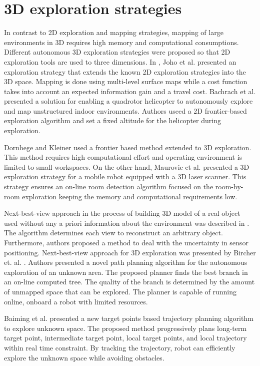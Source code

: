\section{3D exploration strategies}

In contrast to 2D exploration and mapping strategies, mapping of large environments in 3D requires high memory and
computational consumptions. 
Different autonomous 3D exploration strategies were proposed so that 2D
exploration tools are used to three dimensions. In \cite{Joho2007}, Joho et al. presented an exploration strategy that extends the known 2D exploration strategies into the 3D space. Mapping is done using multi-level surface maps while a cost function takes
into account an expected information gain and a travel cost. 
Bachrach et
al. \cite{Bachrach2009} presented a solution for enabling a quadrotor helicopter to
autonomously explore and map unstructured indoor environments. Authors useed a 2D frontier-based exploration algorithm and set a fixed altitude for the helicopter
during exploration.  

Dornhege and Kleiner \cite{Dornhege2013} used a frontier based method extended to 3D exploration. This method requires high computational effort and operating environment is limited to small workspaces. On the other hand, Maurovic et al. \cite{Maurovic2014} presented a 3D exploration strategy for a mobile
robot equipped with a 3D laser scanner. This strategy ensures an on-line room detection algorithm focused on the room-by-room exploration keeping the memory and computational
requirements low.

Next-best-view approach in the process of building 3D model of a real object used without any a priori information about the environment was described in \cite{VasquezGomez2014}. The algorithm determines each view to reconstruct an arbitrary object. Furthermore, authors proposed a method to deal with the uncertainty in sensor positioning.
Next-best-view approach for 3D exploration was presented by Bircher et. al. \cite{Bircher2016}. Authors presented a novel path planning algorithm for the autonomous exploration of an unknown area. The proposed planner finds the best branch in an on-line computed tree. The quality of the branch is determined by the amount of unmapped space that can be explored. The planner is capable of running online, onboard a robot with limited resources.

Baiming et al. \cite{Baiming2018} presented a new target points based trajectory planning algorithm to explore unknown space. The proposed method progressively plans long-term target point, intermediate target point, local target points,
and local trajectory within real time constraint. By tracking the trajectory, robot can efficiently explore the unknown space while avoiding obstacles.

